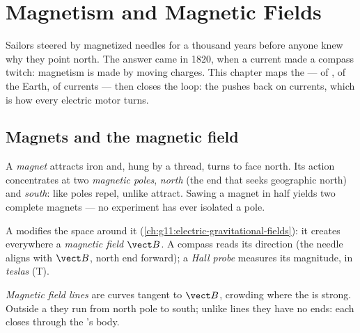 \chapter{Magnetism and Magnetic Fields}\label{ch:g11:magnetic-fields}

Sailors steered by magnetized needles for a thousand years before
anyone knew why they point north. The answer came in 1820, when a
current made a compass twitch: magnetism is made by moving charges.
This chapter maps the  --- of , of the Earth, of
currents --- then closes the loop: the  pushes back on currents,
which is how every electric motor turns.

\section{Magnets and the magnetic field}

\begin{definition}\label{def:g11:magnetic-fields:magnet}
A \emph{magnet} attracts iron and, hung by a thread,
turns to face north. Its action concentrates at two \emph{magnetic
poles}, \emph{north} (the end that seeks
geographic north) and \emph{south}: like poles repel, unlike attract.
Sawing a magnet in half yields two complete magnets --- no experiment
has ever isolated a pole.
\end{definition}

\begin{definition}\label{def:g11:magnetic-fields:bfield}
A  modifies the space around it
(\cref{ch:g11:electric-gravitational-fields}): it creates everywhere a
\emph{magnetic field} $\vect B$. A compass reads
its direction (the needle aligns with $\vect B$, north end forward); a
\emph{Hall probe} measures its magnitude, in
\emph{teslas} (\unit{T}).
\end{definition}

\begin{definition}\label{def:g11:magnetic-fields:lines}
\emph{Magnetic field lines} are curves
tangent to $\vect B$, crowding where the  is strong. Outside a
 they run from north pole to south; unlike  lines
they have no ends: each closes through the 's body.
\end{definition}

